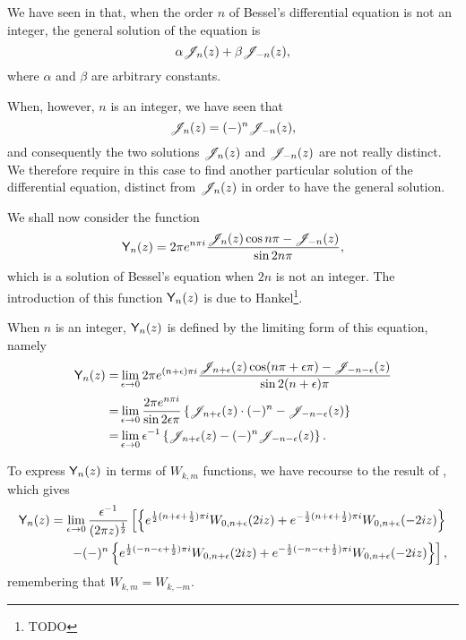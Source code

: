We have seen in  that, when the order $n$ of
Bessel's differential equation is not an integer, the general
solution of the equation is
$$
\alpha \mathscr{J}_{n}(z) + \beta \mathscr{J}_{-n}(z),
$$
where $\alpha$ and $\beta$ are arbitrary constants.

% 
% 
When, however, $n$ is an integer, we have seen that
$$
\mathscr{J}_{n}(z) = (-)^{n} \mathscr{J}_{-n}(z),
$$
and consequently the two solutions $\mathscr{J}_{n}(z)$ and $\mathscr{J}_{-n}(z)$ are
not really distinct. We therefore require in this case to find
another particular solution of the differential equation, distinct
from $\mathscr{J}_{n}(z)$ in order to have the general solution.

We shall now consider the function
$$
\mathsf{Y}_{n}(z)
=
2 \pi e^{n \pi i}
\frac{\mathscr{J}_{n}(z)\cos n\pi - \mathscr{J}_{-n}(z)}{\sin 2n\pi},
$$
which is a solution of Bessel's equation when $2n$ is not an
integer.
The introduction of this function $\mathsf{Y}_{n}(z)$ is due to
Hankel\footnote{TODO}.

When $n$ is an integer, $\mathsf{Y}_{n}(z)$ is defined by the limiting
form of this equation, namely
\begin{align*}
  \mathsf{Y}_{n}(z)
  =& \lim_{\epsilon\rightarrow 0}
  2\pi e^{(n+\epsilon)\pi i} \frac{ \mathscr{J}_{n+\epsilon}(z) \cos(n\pi+\epsilon\pi) -
    \mathscr{J}_{-n-\epsilon}(z)}{\sin 2(n+\epsilon)\pi}
  \\
  =& \lim_{\epsilon\rightarrow 0}
  \frac{2\pi e^{n\pi i}}{\sin 2\epsilon\pi}
  \left\{  \mathscr{J}_{n+\epsilon}(z) \cdot(-)^{n} - \mathscr{J}_{-n-\epsilon}(z) \right\}
  \\
  =&
  \lim_{\epsilon\rightarrow 0}
  \epsilon^{-1}
  \left\{  \mathscr{J}_{n+\epsilon}(z) - (-)^{n} \mathscr{J}_{-n-\epsilon}(z) \right\}.
\end{align*}

To express $\mathsf{Y}_{n}(z)$ in terms of $W_{k,m}$ functions, we have
recourse to the result of , which gives
\begin{align*}
  \mathsf{Y}_{n}(z)
  = \lim_{\epsilon\rightarrow 0}
  \frac{\epsilon^{-1}}{ (2\pi z)^{\frac{1}{2}}}
  \left[
    \left\{ 
      e^{\frac{1}{2}(n+\epsilon+\frac{1}{2})\pi i} W_{0,n+\epsilon}(2iz)
      + e^{-\frac{1}{2}(n+\epsilon+\frac{1}{2})\pi i} W_{0,n+\epsilon}(-2iz)
     \right\}
  \right.
  \\
  \left.
    - (-)^{n}
    \left\{ 
      e^{\frac{1}{2}(-n-\epsilon+\frac{1}{2})\pi i} W_{0,n+\epsilon}(2iz)
      + e^{-\frac{1}{2} (-n-\epsilon+\frac{1}{2})\pi i} W_{0,n+\epsilon}(-2iz)
     \right\}
  \right],
\end{align*}
remembering that $W_{k,m} = W_{k,-m}$.

